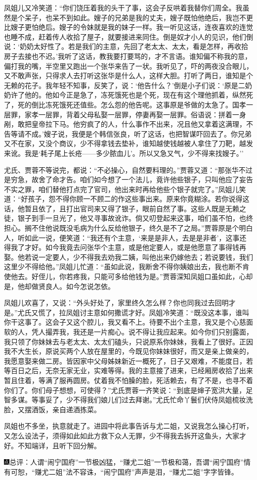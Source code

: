 凤姐儿又冷笑道：``你们饶压着我的头干了事，这会子反哄着我替你们周全。我虽然是个呆子，也呆不到如此。嫂子的兄弟是我的丈夫，嫂子既怕他绝后，我岂不更比嫂子更怕绝后。嫂子的令妹就是我的妹子一样。我一听见这话，连夜喜欢的连觉也睡不成，赶着传人收拾了屋子，就要接进来同住。倒是奴才小人的见识，他们倒说：`奶奶太好性了。若是我们的主意，先回了老太太、太太，看是怎样，再收拾房子去接也不迟。'我听了这话，教我要打要骂的，才不言语。谁知偏不称我的意，偏打我的嘴，半空里又跑出一个张华来告了一状。我听见了，吓的两夜没合眼儿，又不敢声张，只得求人去打听这张华是什么人，这样大胆。打听了两日，谁知是个无赖的花子。我年轻不知事，反笑了，说：`他告什么？'倒是小子们说：`原是二奶奶许了他的。他如今正是急了，冻死饿死也是个死，现在有这个理他抓着，纵然死了，死的倒比冻死饿死还值些。怎么怨的他告呢。这事原是爷做的太急了。国孝一层罪，家孝一层罪，背着父母私娶一层罪，停妻再娶一层罪。俗语说：拼着一身剐，敢把皇帝拉下马。他穷疯了的人，什么事作不出来，况且他又拿着这满理，不告等请不成。'嫂子说，我便是个韩信张良，听了这话，也把智谋吓回去了。你兄弟又不在家，又没个商议，少不得拿钱去垫补，谁知越使钱越被人拿住了刀靶，越发来讹。我是`耗子尾上长疮------多少脓血儿'。所以又急又气，少不得来找嫂子。''

尤氏、贾蓉不等说完，都说：``不必操心，自然要料理的。''贾蓉又道：``那张华不过是穷急，故舍了命才告。咱们如今想了一个法儿，竟许他些银子，只叫他应了妄告不实之罪，咱们替他打点完了官司，他出来时再给他些个银子就完了。''凤姐儿笑道：``好孩子，怨不得你顾一不顾二的作这些事出来。原来你竟糊涂。若你说得这话，他暂且依了，且打出官司来又得了银子，眼前自然了事。这些人既是无赖之徒，银子到手一旦光了，他又寻事故讹诈。倘又叨登起来这事，咱们虽不怕，也终担心。搁不住他说既没毛病为什么反给他银子，终久是不了之局。''贾蓉原是个明白人，听如此一说，便笑道：``我还有个主意，`来是是非人，去是是非者'，这事还得我了才好。如今我竟去问张华个主意，或是他定要人，或是他愿意了事得钱再娶。他若说一定要人，少不得我去劝我二姨，叫他出来仍嫁他去；若说要钱，我们这里少不得给他。''凤姐儿忙道：``虽如此说，我断舍不得你姨娘出去，我也断不肯使他去。好侄儿，你若疼我，只能可多给他钱为是。''贾蓉深知凤姐口虽如此，心却是，他却做贤良人。如今怎说怎依。

凤姐儿欢喜了，又说：``外头好处了，家里终久怎么样？你也同我过去回明才是。''尤氏又慌了，拉凤姐讨主意如何撒谎才好。凤姐冷笑道：``既没这本事，谁叫你干这事了。这会子又这个腔儿，我又看不上。待要不出个主意，我又是个心慈面软的人，凭人撮弄我，我还是一片痴心。说不得让我应起来。如今你们只别露面，我只领了你妹妹去与老太太、太太们磕头，只说原系你妹妹，我看上了很好。正因我不大生长，原说买两个人放在屋里的，今既见你妹妹很好，而又是亲上做亲的，我愿意娶来做二房。皆因家中父母姊妹新近一概死了，日子又艰难，不能度日，若等百日之后，无奈无家无业，实难等得。我的主意接了进来，已经厢房收拾了出来暂且住着，等满了服再圆房。仗着我不怕臊的脸，死活赖去，有了不是，也寻不着你们了。你们母子想想，可使得？''尤氏贾蓉一齐笑说：``到底是婶子宽洪大量，足智多谋。等事妥了，少不得我们娘儿们过去拜谢。''尤氏忙命丫鬟们伏侍凤姐梳妆洗脸，又摆酒饭，亲自递酒拣菜。

凤姐也不多坐，执意就走了。进园中将此事告诉与尤二姐，又说我怎么操心打听，又怎么设法子，须得如此如此方救下众人无罪，少不得我去拆开这鱼头，大家才好。不知端详，且听下回分解。

{\includegraphics[width=3mm]{../Images/00005}\kaishu 总评：人谓``闹宁国府''一节极凶猛，``赚尤二姐''一节极和蔼，吾谓``闹宁国府''情有可恕，``赚尤二姐''法不容诛，``闹宁国府''声声是泪，``赚尤二姐''字字皆锋。}
